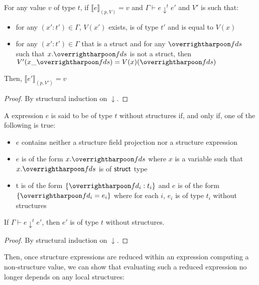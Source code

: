 \begin{lemma}
  For any value $v$ of type $t$, if $\llbracket e \rrbracket_{(p,V)} =
  v$ and $\Gamma \vdash e \downarrow^t e'$ and $V'$ is such that:
  \begin{itemize}
  \item for any $(x': t') \in \Gamma$,  $V(x')$ exists, is of type $t'$ and is equal to $V(x)$
  \item for any $(x': t') \in \Gamma$ that is a struct and for any $\ls{fds}$ such that $x.\ls{fds}$ is not a struct, then $V'(x\_\ls{fds}) = V(x)(\ls{fds})$
  \end{itemize}
  Then, $\llbracket e' \rrbracket_{(p,V')} = v$
\end{lemma}
\begin{proof}
  By structural induction on $\downarrow$.
\end{proof}

\begin{definition}
  A \cstar expression $e$ is said to be of type $t$ without structures if, and only
  if, one of the following is true:
  \begin{itemize}
  \item $e$ contains neither a structure field projection nor a structure expression
  \item $e$ is of the form $x.\ls{fds}$ where $x$ is a variable such
    that $x.\ls{fds}$ is of $\text{\textsf{struct}}$ type
  \item t is of the form $\{ \ls{fd_i : t_i} \}$ and $e$ is of the form $\{ \ls{fd_i = e_i} \}$ where for each $i$, $e_i$ is of type $t_i$ without structures
  \end{itemize}
\end{definition}

\begin{lemma}
  If $\Gamma \vdash e \downarrow^t e'$, then $e'$ is of type $t$
  without structures.
\end{lemma}
\begin{proof}
  By structural induction on $\downarrow$.
\end{proof}

Then, once structure expressions are reduced within an expression
computing a non-structure value, we can show that evaluating such a
reduced expression no longer depends on any local structures:

